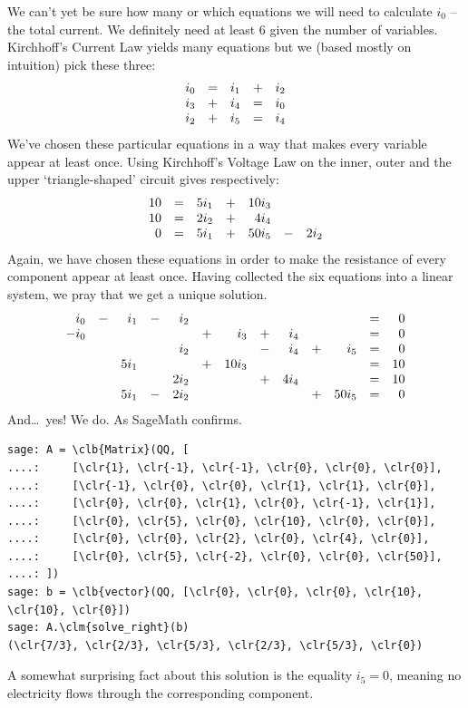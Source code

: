 We can't yet be sure how many or which equations we will need to calculate $i_0$
-- the total current. We definitely need at least 6 given the number of
variables. Kirchhoff's Current Law yields many equations but we (based mostly on
intuition) pick these three:
\[
 \begin{array}{r c r c r}
  i_0 & = & i_1 & + & i_2\\
  i_3 & + & i_4 & = & i_0\\
  i_2 & + & i_5 & = & i_4
 \end{array}
\]
We've chosen these particular equations in a way that makes every variable
appear at least once. Using Kirchhoff's Voltage Law on the inner, outer and the
upper `triangle-shaped' circuit gives respectively:
\[
 \begin{array}{r c r c r c r}
  10 & = & 5i_1 & + & 10i_3 & & \\
  10 & = & 2i_2 & + & 4i_4 & & \\
  0 & = & 5i_1 & + & 50i_5 & - & 2i_2
 \end{array}
\]
Again, we have chosen these equations in order to make the resistance of every
component appear at least once. Having collected the six equations into a linear
system, we pray that we get a unique solution.
\[
 \begin{array}{r c r c r c r c r c r c r}
  i_0 & - & i_1 & - & i_2 & & & & & & & = & 0\\
  -i_0 & & & & & + & i_3 & + & i_4 & & & = & 0\\
       & & & & i_2 & & & - & i_4 & + & i_5 & = & 0\\
       & & 5i_1 & & & + & 10i_3 & & & & & = & 10\\
       & & & & 2i_2 & & & + & 4i_4 & & & = & 10\\
       & & 5i_1 & - & 2i_2 & & & & & + & 50i_5 & = & 0
 \end{array}
\]
And\dots~yes! We do. As SageMath confirms.
\begin{Verbatim}
sage: A = \clb{Matrix}(QQ, [
....:     [\clr{1}, \clr{-1}, \clr{-1}, \clr{0}, \clr{0}, \clr{0}],
....:     [\clr{-1}, \clr{0}, \clr{0}, \clr{1}, \clr{1}, \clr{0}],
....:     [\clr{0}, \clr{0}, \clr{1}, \clr{0}, \clr{-1}, \clr{1}],
....:     [\clr{0}, \clr{5}, \clr{0}, \clr{10}, \clr{0}, \clr{0}],
....:     [\clr{0}, \clr{0}, \clr{2}, \clr{0}, \clr{4}, \clr{0}],
....:     [\clr{0}, \clr{5}, \clr{-2}, \clr{0}, \clr{0}, \clr{50}],
....: ])
sage: b = \clb{vector}(QQ, [\clr{0}, \clr{0}, \clr{0}, \clr{10}, \clr{10}, \clr{0}])
sage: A.\clm{solve_right}(b)
(\clr{7/3}, \clr{2/3}, \clr{5/3}, \clr{2/3}, \clr{5/3}, \clr{0})
\end{Verbatim}
A somewhat surprising fact about this solution is the equality $i_5 = 0$,
meaning no electricity flows through the corresponding component.

